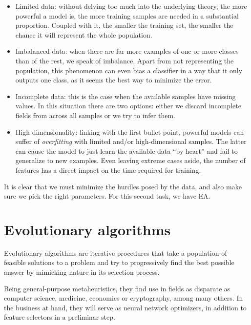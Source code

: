     \begin{itemize}

    	\item
    	Limited data: without delving too much into the underlying theory, the more powerful a model is, the more training samples are needed in a substantial proportion. Coupled with it, the smaller the training set, the smaller the chance it will represent the whole population.

    	\item
    	Imbalanced data: when there are far more examples of one or more classes than of the rest, we speak of imbalance. Apart from not representing the population, this phenomenon can even bias a classifier in a way that it only outputs one class, as it seems the best way to minimize the error.

    	\item
    	Incomplete data: this is the case when the available samples have missing values. In this situation there are two options: either we discard incomplete fields from across all samples or we try to infer them.

    	\item
    	High dimensionality: linking with the first bullet point, powerful models can suffer of \textit{overfitting} with limited and/or high-dimensional samples. The latter can cause the model to just learn the available data ``by heart'' and fail to generalize to new examples. Even leaving extreme cases aside, the number of features has a direct impact on the time required for training.

    \end{itemize}

    It is clear that we must minimize the hurdles posed by the data, and also make sure we pick the right parameters. For this second task, we have \acf{EA}.

\section{Evolutionary algorithms}\label{sec:genetic_algorithms}

	Evolutionary algorithms are iterative procedures that take a population of feasible solutions to a problem and try to progressively find the best possible answer by mimicking nature in its selection process. 

	Being general-purpose metaheuristics, they find use in fields as disparate as computer science, medicine, economics or cryptography, among many others. In the business at hand, they will serve as neural network optimizers, in addition to feature selectors in a preliminar step.

